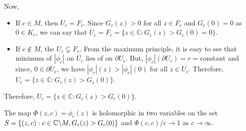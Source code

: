 \noindent Now,
\begin{itemize}
	\item If \( c\in M \), then \( U_c=F_c \). Since \( G_c(z)>0 \)
		for all \( z\in F_c \) and \( G_c(0)=0 \) as \( 0\in K_c \),
		we can say that \( U_c=F_c=\{z\in \mathbb{C}:G_c(z)>G_c(0)=0\} \).
	\item If \( c\not\in M \), the \( U_c \subsetneq F_c \). From the maximum principle,
		it is easy to see that minimum of \( |\phi_c| \) on \( \overline{U_c} \) lies of on \( \partial U_c \).
   	But, \( |\phi_c|(\partial U_c)=r=\text{constant} \) and since, \( 0\in \partial U_c \), we have \( |\phi_c|(z)>|\phi_c|(0) \)
		for all \( z \in  U_c \). Therefore, \( U_c=\{z\in \mathbb{C}:G_c(z)>G_c(0)\} \).
\end{itemize}
Therefore, \( U_c=\{z\in \mathbb{C}:G_c(z)>G_c(0)\} \).
\begin{lemma}
	The map \( \Phi(z,c)= \phi_c(z) \) is holomorphic in 
	two variables on the set \( S=\{(z,c): c\in \mathbb{C}\backslash M, G_c(z)>G_c(0)\} \)
	and \( \Phi(c,c) /c \to 1 \) as \( c\to \infty \).
\end{lemma}
